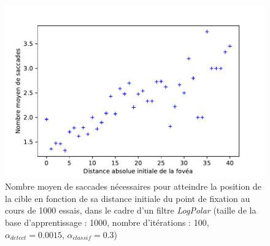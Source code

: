 \begin{figure}[th]
\centering
\includegraphics{Figures/sacc_distance}
\decoRule %
\caption[Figure]{Nombre moyen de saccades nécessaires pour atteindre la position de la cible en fonction de sa distance initiale du point de fixation au cours de 1000 essais, dans le cadre d'un filtre \textit{LogPolar} (taille de la base d'apprentissage :  1000, nombre d'itérations : 100, $\alpha_{detect}=0.0015$, $\alpha_{classif}=0.3$)}
\label{fig:sacc_distance}
\end{figure}
